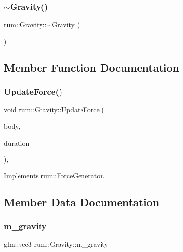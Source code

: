 \subsubsection{\texorpdfstring{$\sim$\+Gravity()}{~Gravity()}}
{\footnotesize\ttfamily rum\+::\+Gravity\+::$\sim$\+Gravity (\begin{DoxyParamCaption}{ }\end{DoxyParamCaption})}



\subsection{Member Function Documentation}
\mbox{\label{classrum_1_1_gravity_a721c721904536378636143b21486ea2c}} 
\subsubsection{\texorpdfstring{Update\+Force()}{UpdateForce()}}
{\footnotesize\ttfamily void rum\+::\+Gravity\+::\+Update\+Force (\begin{DoxyParamCaption}\item[{\hyperlink{classrum_1_1_rigid_body}{Rigid\+Body} $\ast$}]{body,  }\item[{\hyperlink{namespacerum_a7e8cca23573d5eaead0f138cbaa4862c}{real}}]{duration }\end{DoxyParamCaption})\hspace{0.3cm}{\ttfamily [override]}, {\ttfamily [virtual]}}



Implements \hyperlink{classrum_1_1_force_generator_a6b038c9a39e4cf64b2dcf2741804a824}{rum\+::\+Force\+Generator}.



\subsection{Member Data Documentation}
\mbox{\label{classrum_1_1_gravity_a82c9f64363024c45e96ba851a612613b}} 
\subsubsection{\texorpdfstring{m\+\_\+gravity}{m\_gravity}}
{\footnotesize\ttfamily glm\+::vec3 rum\+::\+Gravity\+::m\+\_\+gravity\hspace{0.3cm}{\ttfamily [protected]}}



